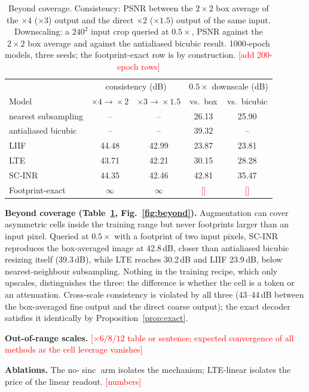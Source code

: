 \documentclass[conference]{IEEEtran}
\newcommand{\todo}[1]{\textcolor{red}{[#1]}}
\newcommand{\sinc}{\operatorname{sinc}}
\begin{document}
\begin{table}[t]\centering\footnotesize
\caption{Beyond coverage. Consistency: PSNR between the $2{\times}2$ box average of the $\times4$ ($\times3$) output and the direct $\times2$ ($\times1.5$) output of the same input. Downscaling: a $240^2$ input crop queried at $0.5\times$, PSNR against the $2{\times}2$ box average and against the antialiased bicubic result. 1000-epoch models, three seeds; the footprint-exact row is by construction. \todo{add 200-epoch rows}}
\label{tab:beyond}
\begin{tabular}{lcccc}\toprule
 & \multicolumn{2}{c}{consistency (dB)} & \multicolumn{2}{c}{$0.5\times$ downscale (dB)}\\
Model & $\times4\!\to\!\times2$ & $\times3\!\to\!\times1.5$ & vs.\ box & vs.\ bicubic\\\midrule
nearest subsampling & -- & -- & 26.13 & 25.90\\
antialiased bicubic & -- & -- & 39.32 & --\\
LIIF & 44.48 & 42.99 & 23.87 & 23.81\\
LTE & 43.71 & 42.21 & 30.15 & 28.28\\
SC-INR & 44.35 & 42.46 & 42.81 & 35.47\\
Footprint-exact & $\infty$ & $\infty$ & \todo{} & \todo{}\\\bottomrule
\end{tabular}
\end{table}

\textbf{Beyond coverage (Table~\ref{tab:beyond}, Fig.~\ref{fig:beyond}).} Augmentation can cover asymmetric cells inside the training range but never footprints larger than an input pixel. Queried at $0.5\times$ with a footprint of two input pixels, SC-INR reproduces the box-averaged image at 42.8\,dB, closer than antialiased bicubic resizing itself (39.3\,dB), while LTE reaches 30.2\,dB and LIIF 23.9\,dB, below nearest-neighbour subsampling. Nothing in the training recipe, which only upscales, distinguishes the three: the difference is whether the cell is a token or an attenuation. Cross-scale consistency is violated by all three (43--44\,dB between the box-averaged fine output and the direct coarse output); the exact decoder satisfies it identically by Proposition~\ref{prop:exact}.

\textbf{Out-of-range scales.} \todo{$\times6/8/12$ table or sentence; expected convergence of all methods as the cell leverage vanishes}

\textbf{Ablations.} The no-$\sinc$ arm isolates the mechanism; LTE-linear isolates the price of the linear readout. \todo{numbers}
\end{document}
